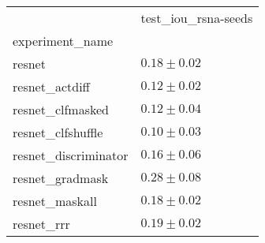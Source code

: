 \begin{tabular}{ll}
\toprule
{} & test_iou_rsna-seeds \\
experiment_name      &                     \\
\midrule
resnet               &       $0.18\pm0.02$ \\
resnet_actdiff       &       $0.12\pm0.02$ \\
resnet_clfmasked     &       $0.12\pm0.04$ \\
resnet_clfshuffle    &       $0.10\pm0.03$ \\
resnet_discriminator &       $0.16\pm0.06$ \\
resnet_gradmask      &       $0.28\pm0.08$ \\
resnet_maskall       &       $0.18\pm0.02$ \\
resnet_rrr           &       $0.19\pm0.02$ \\
\bottomrule
\end{tabular}
